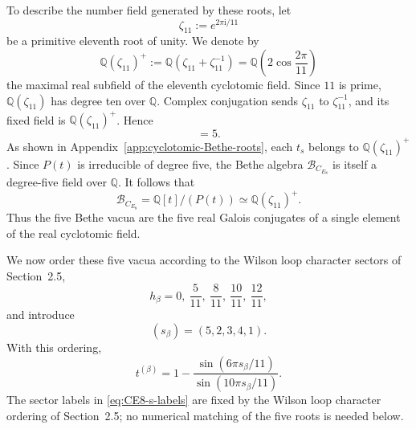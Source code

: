 \documentclass[11pt,a4paper]{article}
\numberwithin{equation}{section}
\begin{document}
To describe the number field generated by these roots, let
\begin{equation}
  \zeta_{11}:=e^{2\pi\mathrm{i}/11}
  \label{eq:zeta11-definition}
\end{equation}
be a primitive eleventh root of unity.  We denote by
\begin{equation}
  \mathbb Q(\zeta_{11})^+
  :=\mathbb Q(\zeta_{11}+\zeta_{11}^{-1})
  =\mathbb Q\!\left(2\cos\frac{2\pi}{11}\right)
  \label{eq:real-cyclotomic-field-definition}
\end{equation}
the maximal real subfield of the eleventh cyclotomic field.  Since $11$ is prime, $\mathbb Q(\zeta_{11})$ has degree ten over $\mathbb Q$.  Complex conjugation sends $\zeta_{11}$ to $\zeta_{11}^{-1}$, and its fixed field is $\mathbb Q(\zeta_{11})^+$.  Hence
\begin{equation}
  [\mathbb Q(\zeta_{11})^+:\mathbb Q]=5.
  \label{eq:real-cyclotomic-field-degree}
\end{equation}
As shown in Appendix~\ref{app:cyclotomic-Bethe-roots}, each $t_s$ belongs to $\mathbb Q(\zeta_{11})^+$.  Since $P(t)$ is irreducible of degree five, the Bethe algebra $\mathcal B_{C_{E_8}}$ is itself a degree-five field over $\mathbb Q$.  It follows that
\begin{equation}
  \mathcal B_{C_{E_8}}
  =\mathbb Q[t]/(P(t))
  \simeq
  \mathbb Q(\zeta_{11})^+.
  \label{eq:CE8-Bethe-cyclotomic-field}
\end{equation}
Thus the five Bethe vacua are the five real Galois conjugates of a single element of the real cyclotomic field.

We now order these five vacua according to the Wilson loop character sectors of Section~2.5,
\begin{equation}
  h_\beta
  =0,\ \frac5{11},\ \frac8{11},\ \frac{10}{11},\ \frac{12}{11},
\end{equation}
and introduce
\begin{equation}
  (s_\beta)=(5,2,3,4,1).
  \label{eq:CE8-s-labels}
\end{equation}
With this ordering,
\begin{equation}
  t^{(\beta)}
  =1-\frac{\sin(6\pi s_\beta/11)}{\sin(10\pi s_\beta/11)}.
  \label{eq:CE8-Bethe-roots-exact}
\end{equation}
The sector labels in \eqref{eq:CE8-s-labels} are fixed by the Wilson loop character ordering of Section~2.5; no numerical matching of the five roots is needed below.
\end{document}
